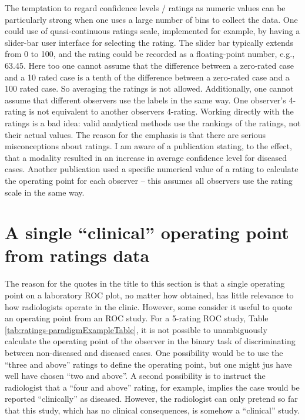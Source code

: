 \documentclass[
]{book}
\begin{document}
The temptation to regard confidence levels / ratings as numeric values can be particularly strong when one uses a large number of bins to collect the data. One could use of quasi-continuous ratings scale, implemented for example, by having a slider-bar user interface for selecting the rating. The slider bar typically extends from 0 to 100, and the rating could be recorded as a floating-point number, e.g., 63.45. Here too one cannot assume that the difference between a zero-rated case and a 10 rated case is a tenth of the difference between a zero-rated case and a 100 rated case. So averaging the ratings is not allowed. Additionally, one cannot assume that different observers use the labels in the same way. One observer's 4-rating is not equivalent to another observers 4-rating. Working directly with the ratings is a bad idea: valid analytical methods use the rankings of the ratings, not their actual values. The reason for the emphasis is that there are serious misconceptions about ratings. I am aware of a publication stating, to the effect, that a modality resulted in an increase in average confidence level for diseased cases. Another publication used a specific numerical value of a rating to calculate the operating point for each observer -- this assumes all observers use the rating scale in the same way.

\hypertarget{binary-task-clinical-operating-point}{%
\section{A single ``clinical'' operating point from ratings data}\label{binary-task-clinical-operating-point}}

The reason for the quotes in the title to this section is that a single operating point on a laboratory ROC plot, no matter how obtained, has little relevance to how radiologists operate in the clinic. However, some consider it useful to quote an operating point from an ROC study. For a 5-rating ROC study, Table \ref{tab:ratings-paradigmExampleTable}, it is not possible to unambiguously calculate the operating point of the observer in the binary task of discriminating between non-diseased and diseased cases. One possibility would be to use the ``three and above'' ratings to define the operating point, but one might jus have well have chosen ``two and above''. A second possibility is to instruct the radiologist that a ``four and above'' rating, for example, implies the case would be reported ``clinically'' as diseased. However, the radiologist can only pretend so far that this study, which has no clinical consequences, is somehow a ``clinical'' study.
\end{document}
